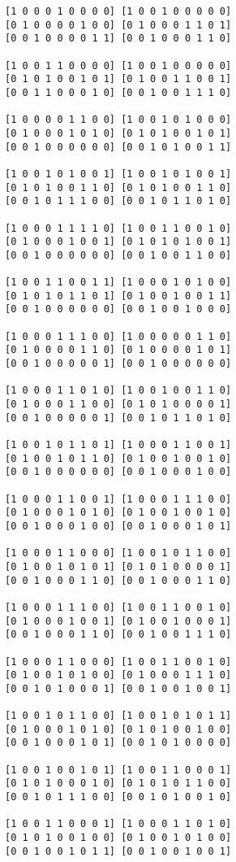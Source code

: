 \begin{lstlisting}
[1 0 0 0 1 0 0 0 0] [1 0 0 1 0 0 0 0 0] 
[0 1 0 0 0 0 1 0 0] [0 1 0 0 0 1 1 0 1] 
[0 0 1 0 0 0 0 1 1] [0 0 1 0 0 0 1 1 0] 

[1 0 0 1 1 0 0 0 0] [1 0 0 1 0 0 0 0 0] 
[0 1 0 1 0 0 1 0 1] [0 1 0 0 1 1 0 0 1] 
[0 0 1 1 0 0 0 1 0] [0 0 1 0 0 1 1 1 0] 

[1 0 0 0 0 1 1 0 0] [1 0 0 1 0 1 0 0 0] 
[0 1 0 0 0 1 0 1 0] [0 1 0 1 0 0 1 0 1] 
[0 0 1 0 0 0 0 0 0] [0 0 1 0 1 0 0 1 1] 

[1 0 0 1 0 1 0 0 1] [1 0 0 1 0 1 0 0 1] 
[0 1 0 1 0 0 1 1 0] [0 1 0 1 0 0 1 1 0] 
[0 0 1 0 1 1 1 0 0] [0 0 1 0 1 1 0 1 0] 

[1 0 0 0 1 1 1 1 0] [1 0 0 1 1 0 0 1 0] 
[0 1 0 0 0 1 0 0 1] [0 1 0 1 0 1 0 0 1] 
[0 0 1 0 0 0 0 0 0] [0 0 1 0 0 1 1 0 0] 

[1 0 0 1 1 0 0 1 1] [1 0 0 0 1 0 1 0 0] 
[0 1 0 1 0 1 1 0 1] [0 1 0 0 1 0 0 1 1] 
[0 0 1 0 0 0 0 0 0] [0 0 1 0 0 1 0 0 0] 

[1 0 0 0 1 1 1 0 0] [1 0 0 0 0 0 1 1 0] 
[0 1 0 0 0 0 1 1 0] [0 1 0 0 0 0 1 0 1] 
[0 0 1 0 0 0 0 0 1] [0 0 1 0 0 0 0 0 0] 

[1 0 0 0 1 1 0 1 0] [1 0 0 1 0 0 1 1 0] 
[0 1 0 0 0 1 1 0 0] [0 1 0 1 0 0 0 0 1] 
[0 0 1 0 0 0 0 0 1] [0 0 1 0 1 1 0 1 0] 

[1 0 0 1 0 1 1 0 1] [1 0 0 0 1 1 0 0 1] 
[0 1 0 0 1 0 1 1 0] [0 1 0 0 1 0 0 1 0] 
[0 0 1 0 0 0 0 0 0] [0 0 1 0 0 0 1 0 0] 

[1 0 0 0 1 1 0 0 1] [1 0 0 0 1 1 1 0 0] 
[0 1 0 0 0 1 0 1 0] [0 1 0 0 1 0 0 1 0] 
[0 0 1 0 0 0 1 0 0] [0 0 1 0 0 0 1 0 1] 

[1 0 0 0 1 1 0 0 0] [1 0 0 1 0 1 1 0 0] 
[0 1 0 0 1 0 1 0 1] [0 1 0 1 0 0 0 0 1] 
[0 0 1 0 0 0 1 1 0] [0 0 1 0 0 0 1 1 0] 

[1 0 0 0 1 1 1 0 0] [1 0 0 1 1 0 0 1 0] 
[0 1 0 0 0 1 0 0 1] [0 1 0 0 1 0 0 0 1] 
[0 0 1 0 0 0 1 1 0] [0 0 1 0 0 1 1 1 0] 

[1 0 0 0 1 1 0 0 0] [1 0 0 1 1 0 0 1 0] 
[0 1 0 0 1 0 1 0 0] [0 1 0 0 0 1 1 1 0] 
[0 0 1 0 1 0 0 0 1] [0 0 1 0 0 1 0 0 1] 

[1 0 0 1 0 1 1 0 0] [1 0 0 1 0 1 0 1 1] 
[0 1 0 0 0 1 0 1 0] [0 1 0 1 0 0 1 0 0] 
[0 0 1 0 0 0 1 0 1] [0 0 1 0 1 0 0 0 0] 

[1 0 0 1 0 0 1 0 1] [1 0 0 1 1 0 0 0 1] 
[0 1 0 1 0 0 0 1 0] [0 1 0 1 0 1 1 0 0] 
[0 0 1 0 1 1 1 0 0] [0 0 1 0 1 0 0 1 0] 

[1 0 0 1 1 0 0 0 1] [1 0 0 0 1 1 0 1 0] 
[0 1 0 1 0 0 1 0 0] [0 1 0 0 1 0 1 0 0] 
[0 0 1 0 0 1 0 1 1] [0 0 1 0 0 1 0 0 1] 


\end{lstlisting}
